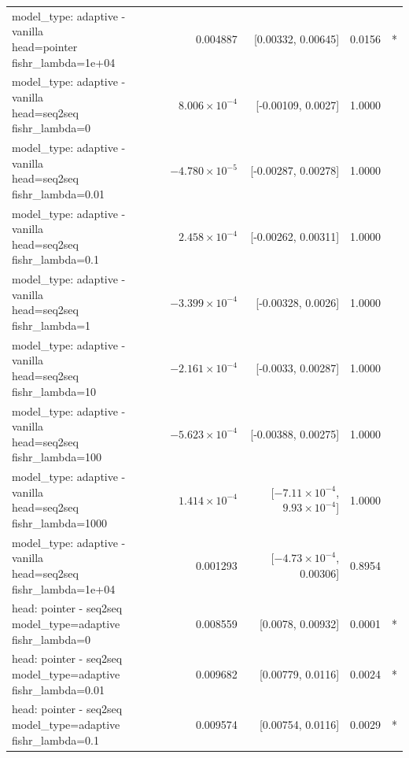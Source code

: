 \documentclass[10pt]{article}
\makeatletter
\newcommand{\stackcell}[1]{\begin{tabular}[t]{@{}l@{}}#1\end{tabular}}
\makeatother
\begin{document}
{\begin{longtable}{lrrrl}
\stackcell{model\_type: adaptive - vanilla\\\footnotesize head=pointer fishr\_lambda=1e+04 } & 0.004887 & [0.00332, 0.00645] & 0.0156 & *\\
\stackcell{model\_type: adaptive - vanilla\\\footnotesize head=seq2seq fishr\_lambda=0 } & $8.006\times10^{-4}$ & [-0.00109, 0.0027] & 1.0000 & \\
\stackcell{model\_type: adaptive - vanilla\\\footnotesize head=seq2seq fishr\_lambda=0.01 } & $-4.780\times10^{-5}$ & [-0.00287, 0.00278] & 1.0000 & \\
\stackcell{model\_type: adaptive - vanilla\\\footnotesize head=seq2seq fishr\_lambda=0.1 } & $2.458\times10^{-4}$ & [-0.00262, 0.00311] & 1.0000 & \\
\stackcell{model\_type: adaptive - vanilla\\\footnotesize head=seq2seq fishr\_lambda=1 } & $-3.399\times10^{-4}$ & [-0.00328, 0.0026] & 1.0000 & \\
\stackcell{model\_type: adaptive - vanilla\\\footnotesize head=seq2seq fishr\_lambda=10 } & $-2.161\times10^{-4}$ & [-0.0033, 0.00287] & 1.0000 & \\
\stackcell{model\_type: adaptive - vanilla\\\footnotesize head=seq2seq fishr\_lambda=100 } & $-5.623\times10^{-4}$ & [-0.00388, 0.00275] & 1.0000 & \\
\stackcell{model\_type: adaptive - vanilla\\\footnotesize head=seq2seq fishr\_lambda=1000 } & $1.414\times10^{-4}$ & [$-7.11\times10^{-4}$, $9.93\times10^{-4}$] & 1.0000 & \\
\stackcell{model\_type: adaptive - vanilla\\\footnotesize head=seq2seq fishr\_lambda=1e+04 } & 0.001293 & [$-4.73\times10^{-4}$, 0.00306] & 0.8954 & \\
\stackcell{head: pointer - seq2seq\\\footnotesize model\_type=adaptive fishr\_lambda=0 } & 0.008559 & [0.0078, 0.00932] & 0.0001 & *\\
\stackcell{head: pointer - seq2seq\\\footnotesize model\_type=adaptive fishr\_lambda=0.01 } & 0.009682 & [0.00779, 0.0116] & 0.0024 & *\\
\stackcell{head: pointer - seq2seq\\\footnotesize model\_type=adaptive fishr\_lambda=0.1 } & 0.009574 & [0.00754, 0.0116] & 0.0029 & *\\

\end{longtable}}
\end{document}
